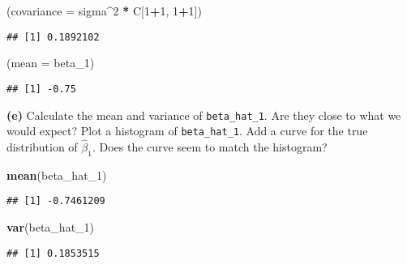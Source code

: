 \documentclass[
]{article}
\newenvironment{Shaded}{\begin{snugshade}}{\end{snugshade}}
\newcommand{\DataTypeTok}[1]{\textcolor[rgb]{0.13,0.29,0.53}{#1}}
\newcommand{\DecValTok}[1]{\textcolor[rgb]{0.00,0.00,0.81}{#1}}
\newcommand{\KeywordTok}[1]{\textcolor[rgb]{0.13,0.29,0.53}{\textbf{#1}}}
\newcommand{\NormalTok}[1]{#1}
\newcommand{\OperatorTok}[1]{\textcolor[rgb]{0.81,0.36,0.00}{\textbf{#1}}}
\newcommand{\StringTok}[1]{\textcolor[rgb]{0.31,0.60,0.02}{#1}}
\begin{document}
\begin{Shaded}
\begin{Highlighting}[]
\NormalTok{(}\DataTypeTok{covariance =}\NormalTok{ sigma}\OperatorTok{^}\DecValTok{2} \OperatorTok{*}\StringTok{ }\NormalTok{C[}\DecValTok{1}\OperatorTok{+}\DecValTok{1}\NormalTok{, }\DecValTok{1}\OperatorTok{+}\DecValTok{1}\NormalTok{])}
\end{Highlighting}
\end{Shaded}

\begin{verbatim}
## [1] 0.1892102
\end{verbatim}

\begin{Shaded}
\begin{Highlighting}[]
\NormalTok{(}\DataTypeTok{mean =}\NormalTok{ beta_}\DecValTok{1}\NormalTok{)}
\end{Highlighting}
\end{Shaded}

\begin{verbatim}
## [1] -0.75
\end{verbatim}

\textbf{(e)} Calculate the mean and variance of \texttt{beta\_hat\_1}.
Are they close to what we would expect? Plot a histogram of
\texttt{beta\_hat\_1}. Add a curve for the true distribution of
\(\hat{\beta}_1\). Does the curve seem to match the histogram?

\begin{Shaded}
\begin{Highlighting}[]
\KeywordTok{mean}\NormalTok{(beta_hat_}\DecValTok{1}\NormalTok{)}
\end{Highlighting}
\end{Shaded}

\begin{verbatim}
## [1] -0.7461209
\end{verbatim}

\begin{Shaded}
\begin{Highlighting}[]
\KeywordTok{var}\NormalTok{(beta_hat_}\DecValTok{1}\NormalTok{)}
\end{Highlighting}
\end{Shaded}

\begin{verbatim}
## [1] 0.1853515
\end{verbatim}
\end{document}
